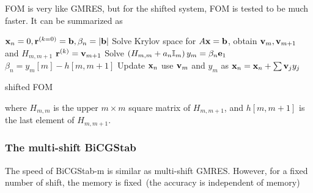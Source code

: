 FOM is very like GMRES, but \textcolor[rgb]{0,0,1}{for the shifted system, FOM is tested to be much faster}. It can be summarized as~\cite{shiftedFOM}
\begin{algorithm}[H]
\begin{algorithmic}
\State ${\bf x}_n=0,{\bf r}^{(k=0)}={\bf b},\beta _n=|{\bf b}|$
    \State Solve Krylov space for $A{\bf x}={\bf b}$, obtain ${\bf v}_m,{\bf v}_{m+1}$ and $H_{m,m+1}$
    \State ${\bf r}^{(k)}={\bf v}_{m+1}$
            \State Solve $\left(H_{m,m}+a_n \mathbb{I}_m\right)y_m=\beta _n {\bf e}_1$
            \State $\beta _n = y_m[m] - h[m,m+1]$
            \State Update ${\bf x}_n$ use ${\bf v}_m$ and $y_m$ as ${\bf x}_n={\bf x}_n+\sum {\bf v}_j y_j$
        \EndIf
    \EndFor
\EndFor
\end{algorithmic}
\caption{\label{alg.FOM.shifted}shifted FOM}
\end{algorithm}
where $H_{m,m}$ is the upper $m\times m$ square matrix of $H_{m,m+1}$, and $h[m,m+1]$ is the last element of $H_{m,m+1}$.

\subsubsection{\label{sec:MultishiftBiCGStab}The multi-shift BiCGStab}

The speed of BiCGStab-m is similar as multi-shift GMRES. However, for a fixed number of shift, the memory is fixed~(the accuracy is independent of memory)

